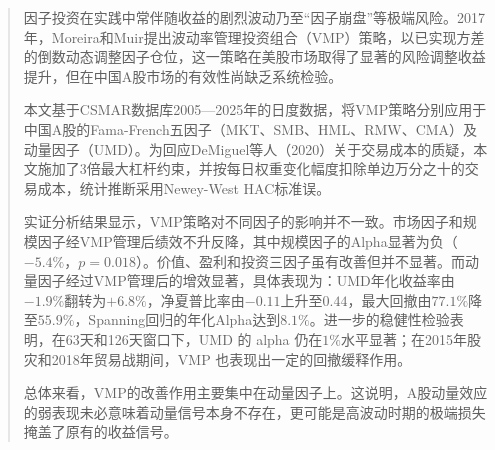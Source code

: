 \documentclass[
    decl-page,
    oneside,
  ]{njuthesis}
\begin{document}

\maketitle
\raggedbottom

\begin{abstract}

因子投资在实践中常伴随收益的剧烈波动乃至“因子崩盘”等极端风险。2017年，Moreira和Muir提出波动率管理投资组合（VMP）策略，以已实现方差的倒数动态调整因子仓位，这一策略在美股市场取得了显著的风险调整收益提升，但在中国A股市场的有效性尚缺乏系统检验。

本文基于CSMAR数据库2005—2025年的日度数据，将VMP策略分别应用于中国A股的Fama-French五因子（MKT、SMB、HML、RMW、CMA）及动量因子（UMD）。为回应DeMiguel等人（2020）关于交易成本的质疑，本文施加了3倍最大杠杆约束，并按每日权重变化幅度扣除单边万分之十的交易成本，统计推断采用Newey-West HAC标准误。

实证分析结果显示，VMP策略对不同因子的影响并不一致。市场因子和规模因子经VMP管理后绩效不升反降，其中规模因子的Alpha显著为负（$-5.4\%$，$p=0.018$）。价值、盈利和投资三因子虽有改善但并不显著。而动量因子经过VMP管理后的增效显著，具体表现为：UMD年化收益率由$-1.9\%$翻转为$+6.8\%$，净夏普比率由$-0.11$上升至$0.44$，最大回撤由$77.1\%$降至$55.9\%$，Spanning回归的年化Alpha达到$8.1\%$。进一步的稳健性检验表明，在63天和126天窗口下，UMD 的 alpha 仍在$1\%$水平显著；在2015年股灾和2018年贸易战期间，VMP 也表现出一定的回撤缓释作用。

总体来看，VMP的改善作用主要集中在动量因子上。这说明，A股动量效应的弱表现未必意味着动量信号本身不存在，更可能是高波动时期的极端损失掩盖了原有的收益信号。

\end{abstract}
\end{document}
